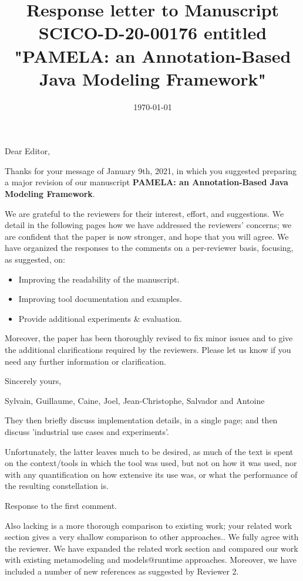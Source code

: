 \documentclass[10pt]{article}
\title{Response letter to Manuscript SCICO-D-20-00176 entitled "PAMELA: an Annotation-Based Java Modeling Framework"}
\date{\today}
\begin{document}
Dear Editor,

\bigskip
Thanks for your message of January 9th, 2021, in which you suggested preparing a major revision of our manuscript  \textbf{PAMELA: an Annotation-Based Java Modeling Framework}. 

\bigskip
We are grateful to the reviewers for their interest, effort, and suggestions. We detail in the following pages how we have addressed the reviewers' concerns; we are confident that the paper is now stronger, and hope that you will agree. We have organized the responses to the comments on a per-reviewer basis, focusing, as suggested, on: 

\begin{itemize}
\item Improving the readability of the manuscript. 
\item Improving tool documentation and examples.
\item Provide additional experiments \& evaluation.
\end{itemize}

Moreover, the paper has been thoroughly revised to fix minor issues and to give the additional clarifications required by the reviewers. Please let us know if you need any further information or clarification.

\bigskip
Sincerely yours,

\bigskip
Sylvain, Guillaume, Caine, Joel, Jean-Christophe, Salvador and Antoine

\pagebreak


\begin{response}{They then briefly discuss implementation details, in a single page; and then discuss 'industrial use cases and experiments'.

Unfortunately, the latter leaves much to be desired, as much of the text is spent on the context/tools in which the tool was used, but not on how it was used, nor with any quantification on how extensive its use was, or what the performance of the resulting constellation is.
} Response to the first comment.
\end{response}

\begin{response}{Also lacking is a more thorough comparison to existing work; your related work section gives a very shallow comparison to other approaches..}
We fully agree with the reviewer. We have expanded the related work section and compared our work with existing metamodeling and models@runtime approaches. Moreover, we have included a number of new references as suggested by Reviewer 2.
\end{response}
\end{document}

